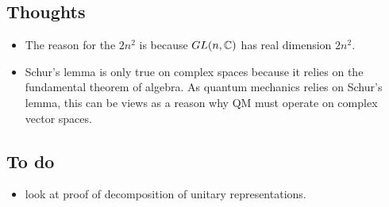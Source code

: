 \documentclass[a4paper]{article}
\begin{document}
\subsection{Thoughts}
\begin{itemize}
    \item The reason for the $2n^2$ is because $GL(n, \mathbb{C})$ has real dimension $2n^2$.
    \item Schur's lemma is only true on complex spaces because it relies on the fundamental theorem of algebra. As quantum mechanics relies on Schur's lemma, this can be views as a reason why QM must operate on complex vector spaces.
\end{itemize}

\subsection{To do}
\begin{itemize}
    \item look at proof of decomposition of unitary representations.
\end{itemize}
\end{document}
